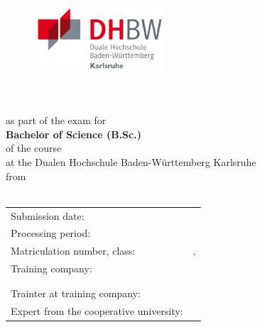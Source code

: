 \thispagestyle{empty}
\begin{titlepage}
	\enlargethispage{4cm}

	\begin{figure}           %
		\begin{minipage}{0.49\textwidth}
			\flushleft
			\includegraphics[height=2.5cm]{Bilder/Logos/Logo_DHBW.pdf}
		\end{minipage}
	\end{figure}
	\vspace*{0.1cm}

	\begin{center}
		\huge{\textbf{\titel}}\\[1.5cm]
		\Large{\textbf{\arbeit}}\\[0.5cm]
		\normalsize{as part of the exam for\\[1ex] \textbf{Bachelor of Science (B.Sc.)}}\\[0.5cm]
		\Large{of the course \studiengang}\\[1ex]
		\normalsize{at the Dualen Hochschule Baden-Württemberg Karlsruhe}\\[1cm]
		\normalsize{from}\\[1ex] \Large{\textbf{\autor}} \\[1cm]
	\end{center}

	\begin{center}
		\vfill
		\begin{tabular}{ll}
			Submission date:                        & \abgabe               \\[0.2cm]
			Processing period:                      & \bearbeitungszeitraum \\[0.2cm]
			Matriculation number, class:            & \matrikelnr , \kurs   \\[0.2cm]
			Training company:                       & \firmaName            \\
			                                        & \firmaStrasse         \\
			                                        & \firmaPlz             \\[0.2cm]
			Trainter at training company:           & \betreuerFirma        \\[0.2cm]
			Expert from the cooperative university: & \betreuerDhbw         \\[2cm]
		\end{tabular}
	\end{center}
\end{titlepage}
